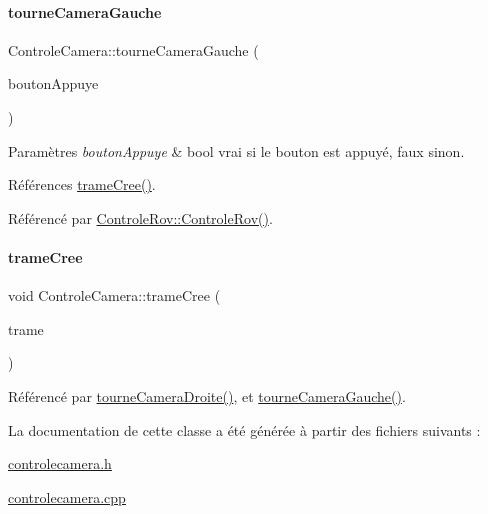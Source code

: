 \paragraph{\texorpdfstring{tourne\+Camera\+Gauche}{tourneCameraGauche}}
{\footnotesize\ttfamily Controle\+Camera\+::tourne\+Camera\+Gauche (\begin{DoxyParamCaption}\item[{bool}]{bouton\+Appuye }\end{DoxyParamCaption})\hspace{0.3cm}{\ttfamily [slot]}}


\begin{DoxyParams}{Paramètres}
{\em bouton\+Appuye} & bool vrai si le bouton est appuyé, faux sinon. \\
\hline
\end{DoxyParams}


Références \hyperlink{class_controle_camera_ae6fda972cd90c8a14bc1c0171e1600e5}{trame\+Cree()}.



Référencé par \hyperlink{class_controle_rov_acc4d5fea26770217df978d43df2ad51e}{Controle\+Rov\+::\+Controle\+Rov()}.


\mbox{\label{class_controle_camera_ae6fda972cd90c8a14bc1c0171e1600e5}} 
\paragraph{\texorpdfstring{trame\+Cree}{trameCree}}
{\footnotesize\ttfamily void Controle\+Camera\+::trame\+Cree (\begin{DoxyParamCaption}\item[{Q\+String}]{trame }\end{DoxyParamCaption})\hspace{0.3cm}{\ttfamily [signal]}}



Référencé par \hyperlink{class_controle_camera_aac294c4e98a912199ba32d686e52f7ef}{tourne\+Camera\+Droite()}, et \hyperlink{class_controle_camera_a119562aacbb4c0fbd4e5aa27a05ce7cc}{tourne\+Camera\+Gauche()}.



La documentation de cette classe a été générée à partir des fichiers suivants \+:\begin{DoxyCompactItemize}
\item 
\hyperlink{controlecamera_8h}{controlecamera.\+h}\item 
\hyperlink{controlecamera_8cpp}{controlecamera.\+cpp}\end{DoxyCompactItemize}
